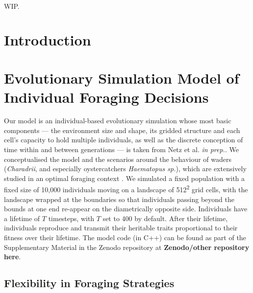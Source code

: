 \documentclass[11pt]{article}
\begin{document}
WIP.

\newpage{}

\section*{Introduction}


\section*{Evolutionary Simulation Model of Individual Foraging Decisions}

Our model is an individual-based evolutionary simulation whose most basic components --- the environment size and shape, its gridded structure and each cell's capacity to hold multiple individuals, as well as the discrete conception of time within and between generations --- is taken from Netz et al. \textit{in prep.}.
We conceptualised the model and the scenarios around the behaviour of waders (\textit{Charadrii}, and especially oystercatchers \textit{Haematopus sp.}), which are extensively studied in an optimal foraging context \citep[e.g. ][]{vahl2005, vahl2005a, vahl2005b, ENS1990219}.
We simulated a fixed population with a fixed size of 10,000 individuals moving on a landscape of 512\textsuperscript{2} grid cells, with the landscape wrapped at the boundaries so that individuals passing beyond the bounds at one end re-appear on the diametrically opposite side.
Individuals have a lifetime of $T$ timesteps, with $T$ set to 400 by default.
After their lifetime, individuals reproduce and transmit their heritable traits proportional to their fitness over their lifetime.
The model code (in C++) can be found as part of the Supplementary Material in the Zenodo repository at \textbf{Zenodo/other repository here}.

\subsection*{Flexibility in Foraging Strategies}
\end{document}

